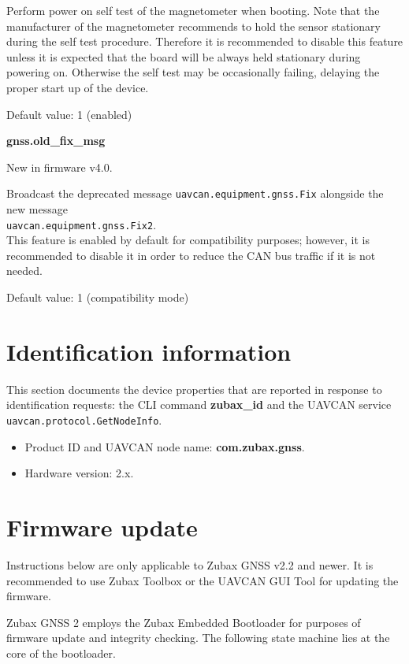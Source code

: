 \documentclass{zubaxdoc}
\begin{document}
Perform power on self test of the magnetometer when booting. Note that the manufacturer of the magnetometer recommends to hold the sensor stationary during the self test procedure. Therefore it is recommended to disable this feature unless it is expected that the board will be always held stationary during powering on. Otherwise the self test may be occasionally failing, delaying the proper start up of the device.

Default value: 1 (enabled)

\textbf{gnss.old{\_}fix{\_}msg}

New in firmware v4.0.

Broadcast the deprecated message \texttt{uavcan.equipment.gnss.Fix} alongside the new message\\ \texttt{uavcan.equipment.gnss.Fix2}.\\This feature is enabled by default for compatibility purposes; however, it is recommended to disable it in order to reduce the CAN bus traffic if it is not needed.

Default value: 1 (compatibility mode)

\chapter{Identification information}

This section documents the device properties that are reported in response to identification requests: the CLI command \textbf{zubax{\_}id} and the UAVCAN service \texttt{uavcan.protocol.GetNodeInfo}.
\begin{itemize}
\item Product ID and UAVCAN node name: \textbf{com.zubax.gnss}.
\item Hardware version: 2.x.
\end{itemize}

\chapter{Firmware update}

Instructions below are only applicable to Zubax GNSS v2.2 and newer. It is recommended to use Zubax Toolbox or the UAVCAN GUI Tool for updating the firmware.

Zubax GNSS 2 employs the Zubax Embedded Bootloader for purposes of firmware update and integrity checking. The following state machine lies at the core of the bootloader.
\end{document}
